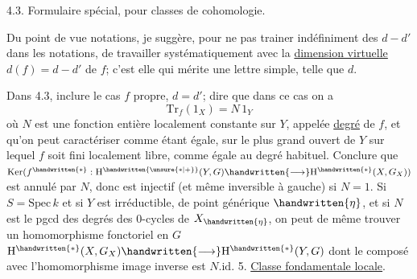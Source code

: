 4.3. Formulaire spécial, pour classes de cohomologie.

Du point de vue notations, je suggère, pour ne pas trainer indéfiniment des $d-d'$ dans les notations, de travailler systématiquement avec la \uline{dimension virtuelle} $d(f)=d-d'$ de $f$; c'est elle qui mérite une lettre simple, telle que $d$.

Dans 4.3, inclure le cas $f$ propre, $d=d'$; dire que dans ce  cas on a
\[
\mathrm{Tr}_f(1_X)=N\,1_Y
\]
où $N$ est une fonction entière localement constante sur $Y$, appelée \uline{degré} de $f$, et qu'on peut caractériser comme étant égale, sur  le plus grand ouvert de $Y$ sur lequel $f$ soit fini localement libre, comme égale au degré habituel. Conclure que $\mathrm{Ker}(f^{\handwritten{*}}:\mathrm{H}^{\handwritten{\unsure{*|+}}}(Y,G)\handwritten{\longrightarrow}\mathrm{H}^{\handwritten{*}}(X,G_X))$ est annulé par $N$, donc est injectif (et même inversible à gauche) si $N=1$. \handwritten{[}Si $S=\mathrm{Spec}\,k$ et si $Y$ est irréductible, de point générique $\handwritten{\eta}$, et si $N$ est le pgcd des degrés des $0$-cycles de $X_{\handwritten{\eta}}$\inserted{\handwritten{$\neq\varnothing$}}, on peut de même trouver un homomorphisme\handwritten{,} fonctoriel en $G$\handwritten{\unsure{$\leftarrow$}}\handwritten{,} $\mathrm{H}^{\handwritten{*}}(X,G_X)\handwritten{\longrightarrow}\mathrm{H}^{\handwritten{*}}(Y,G)$ dont le composé avec l'homomorphisme image inverse est $N.\mathrm{id}$.\handwritten{]}
5. \uline{Classe fondamentale locale}.

